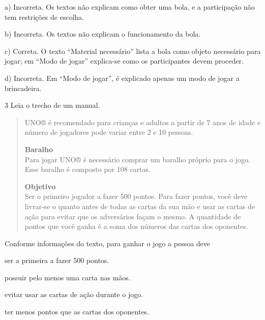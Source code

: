 \begin{escolha}
\begin{escolha}
{a) Incorreta. Os textos não explicam como obter uma bola, e a 
participação não tem restrições de escolha.  

b) Incorreta. Os textos não explicam o funcionamento da bola.

c) Correta. O texto ``Material necessário'' lista a bola como objeto 
necessário para jogar; em ``Modo de jogar'' explica-se como os 
participantes devem proceder.

d) Incorreta. Em ``Modo de jogar'', é explicado apenas um modo de jogar
a brincadeira.}

\num{3} Leia o trecho de um manual.

\begin{quote}
UNO® é recomendado para crianças e adultos a partir de 7 anos de idade e número de jogadores pode variar entre 2 e 10 pessoas.

\textbf{Baralho}\\
Para jogar UNO® é necessário comprar um baralho próprio para o jogo. Esse baralho é composto por 108 cartas.

\textbf{Objetivo}\\
Ser o primeiro jogador a fazer 500 pontos. Para fazer pontos, você deve
livrar-se o quanto antes de todas as cartas da sua mão e usar as cartas 
de ação para evitar que os adversários façam o mesmo. A quantidade de 
pontos que você ganha é a soma dos números das cartas dos oponentes.
\end{quote}


Conforme informações do texto, para ganhar o jogo a pessoa deve

\begin{escolha}
\item ser a primeira a fazer 500 pontos.

\item possuir pelo menos uma carta nas mãos.

\item evitar usar as cartas de ação durante o jogo.

\item ter menos pontos que as cartas dos oponentes.
\end{escolha}


\end{escolha}
\end{escolha}
